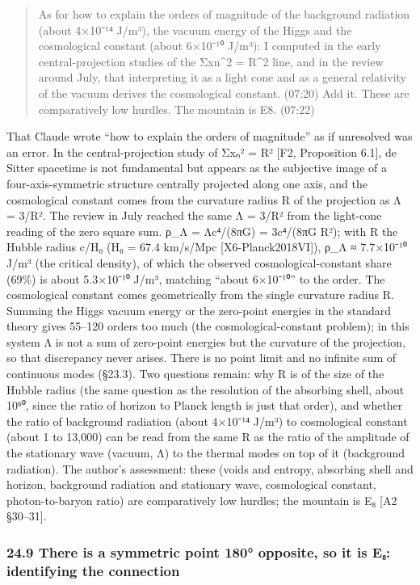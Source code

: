 \documentclass[
  a4paper,
]{article}
\begin{document}
\begin{quote}
As for how to explain the orders of magnitude of the background
radiation (about 4×10⁻¹⁴ J/m³), the vacuum energy of the Higgs and the
cosmological constant (about 6×10⁻¹⁰ J/m³): I computed in the early
central-projection studies of the Σxn\^{}2 = R\^{}2 line, and in the
review around July, that interpreting it as a light cone and as a
general relativity of the vacuum derives the cosmological constant.
(07:20) Add it. These are comparatively low hurdles. The mountain is E8.
(07:22)
\end{quote}

That Claude wrote ``how to explain the orders of magnitude'' as if
unresolved was an error. In the central-projection study of Σxₙ² = R²
{[}F2, Proposition 6.1{]}, de Sitter spacetime is not fundamental but
appears as the subjective image of a four-axis-symmetric structure
centrally projected along one axis, and the cosmological constant comes
from the curvature radius R of the projection as Λ = 3/R². The review in
July reached the same Λ = 3/R² from the light-cone reading of the zero
square sum. ρ\_Λ = Λc⁴/(8πG) = 3c⁴/(8πG R²); with R the Hubble radius
c/H₀ (H₀ = 67.4 km/s/Mpc {[}X6-Planck2018VI{]}), ρ\_Λ ≈ 7.7×10⁻¹⁰ J/m³
(the critical density), of which the observed cosmological-constant
share (69\%) is about 5.3×10⁻¹⁰ J/m³, matching ``about 6×10⁻¹⁰'' to the
order. The cosmological constant comes geometrically from the single
curvature radius R. Summing the Higgs vacuum energy or the zero-point
energies in the standard theory gives 55--120 orders too much (the
cosmological-constant problem); in this system Λ is not a sum of
zero-point energies but the curvature of the projection, so that
discrepancy never arises. There is no point limit and no infinite sum of
continuous modes (§23.3). Two questions remain: why R is of the size of
the Hubble radius (the same question as the resolution of the absorbing
shell, about 10⁶⁰, since the ratio of horizon to Planck length is just
that order), and whether the ratio of background radiation (about
4×10⁻¹⁴ J/m³) to cosmological constant (about 1 to 13,000) can be read
from the same R as the ratio of the amplitude of the stationary wave
(vacuum, Λ) to the thermal modes on top of it (background radiation).
The author's assessment: these (voids and entropy, absorbing shell and
horizon, background radiation and stationary wave, cosmological
constant, photon-to-baryon ratio) are comparatively low hurdles; the
mountain is E₈ {[}A2 §30--31{]}.

\subsubsection{24.9 There is a symmetric point 180° opposite, so it is
E₈: identifying the
connection}\label{there-is-a-symmetric-point-180-opposite-so-it-is-eux2088-identifying-the-connection}
\end{document}
